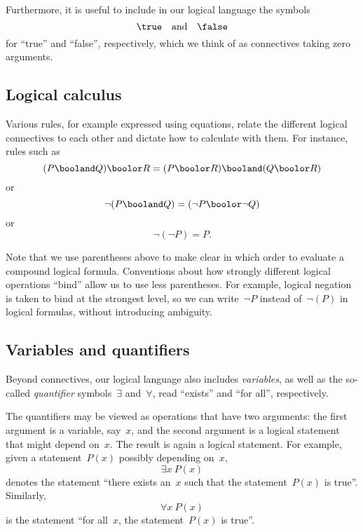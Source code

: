 Furthermore, it is useful to include in our logical language the symbols~
\begin{equation}
    \true \quad \text{and}  \quad \false
\end{equation}
for ``true'' and ``false'', respectively, which we think of as connectives taking zero arguments.

\subsection{Logical calculus}

Various rules, for example expressed using equations, relate the different logical connectives to each other and dictate how to calculate with them.
For instance, rules such as
\begin{equation*}
    (P \booland Q) \boolor R = (P \boolor R) \booland (Q \boolor R)
\end{equation*}
or
\begin{equation*}
    \lnot (P \booland Q)  = (\lnot P \boolor \lnot Q)
\end{equation*}
or
\begin{equation*}
    \lnot (\lnot P) = P.
\end{equation*}

Note that we use parentheses above to make clear in which order to evaluate a compound logical formula.
Conventions about how strongly different logical operations ``bind'' allow us to use less parentheses.
For example, logical negation is taken to bind at the strongest level, so we can write~$\lnot P$ instead of~$\lnot (P)$ in logical formulas, without introducing ambiguity.

\subsection{Variables and quantifiers}

Beyond connectives, our logical language also includes \emph{variables}, as well as the so-called \emph{quantifier} symbols~$\exists$ and~$\forall$, read ``exists'' and ``for all'', respectively.

The quantifiers may be viewed as operations that have two arguments:
the first argument is a variable, say~$x$, and the second argument is a logical statement that might depend on~$x$.
The result is again a logical statement.
For example, given a statement~$P(x)$ possibly depending on~$x$,
\begin{equation*}
    \exists x \ P(x)
\end{equation*}
denotes the statement ``there exists an~$x$ such that the statement~$P(x)$ is true''.
Similarly,
\begin{equation*}
    \forall x \ P(x)
\end{equation*}
is the statement ``for all~$x$, the statement~$P(x)$ is true''.

